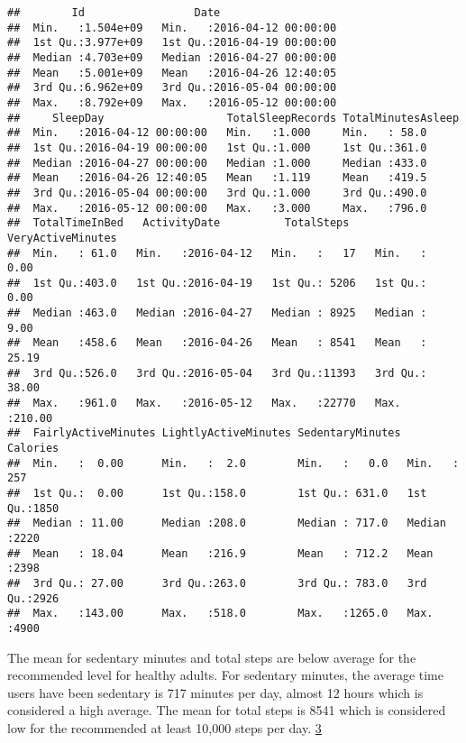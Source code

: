 \documentclass[
]{article}
\begin{document}
\begin{verbatim}
##        Id                 Date                    
##  Min.   :1.504e+09   Min.   :2016-04-12 00:00:00  
##  1st Qu.:3.977e+09   1st Qu.:2016-04-19 00:00:00  
##  Median :4.703e+09   Median :2016-04-27 00:00:00  
##  Mean   :5.001e+09   Mean   :2016-04-26 12:40:05  
##  3rd Qu.:6.962e+09   3rd Qu.:2016-05-04 00:00:00  
##  Max.   :8.792e+09   Max.   :2016-05-12 00:00:00  
##     SleepDay                   TotalSleepRecords TotalMinutesAsleep
##  Min.   :2016-04-12 00:00:00   Min.   :1.000     Min.   : 58.0     
##  1st Qu.:2016-04-19 00:00:00   1st Qu.:1.000     1st Qu.:361.0     
##  Median :2016-04-27 00:00:00   Median :1.000     Median :433.0     
##  Mean   :2016-04-26 12:40:05   Mean   :1.119     Mean   :419.5     
##  3rd Qu.:2016-05-04 00:00:00   3rd Qu.:1.000     3rd Qu.:490.0     
##  Max.   :2016-05-12 00:00:00   Max.   :3.000     Max.   :796.0     
##  TotalTimeInBed   ActivityDate          TotalSteps    VeryActiveMinutes
##  Min.   : 61.0   Min.   :2016-04-12   Min.   :   17   Min.   :  0.00   
##  1st Qu.:403.0   1st Qu.:2016-04-19   1st Qu.: 5206   1st Qu.:  0.00   
##  Median :463.0   Median :2016-04-27   Median : 8925   Median :  9.00   
##  Mean   :458.6   Mean   :2016-04-26   Mean   : 8541   Mean   : 25.19   
##  3rd Qu.:526.0   3rd Qu.:2016-05-04   3rd Qu.:11393   3rd Qu.: 38.00   
##  Max.   :961.0   Max.   :2016-05-12   Max.   :22770   Max.   :210.00   
##  FairlyActiveMinutes LightlyActiveMinutes SedentaryMinutes    Calories   
##  Min.   :  0.00      Min.   :  2.0        Min.   :   0.0   Min.   : 257  
##  1st Qu.:  0.00      1st Qu.:158.0        1st Qu.: 631.0   1st Qu.:1850  
##  Median : 11.00      Median :208.0        Median : 717.0   Median :2220  
##  Mean   : 18.04      Mean   :216.9        Mean   : 712.2   Mean   :2398  
##  3rd Qu.: 27.00      3rd Qu.:263.0        3rd Qu.: 783.0   3rd Qu.:2926  
##  Max.   :143.00      Max.   :518.0        Max.   :1265.0   Max.   :4900
\end{verbatim}

The mean for sedentary minutes and total steps are below average for the
recommended level for healthy adults. For sedentary minutes, the average
time users have been sedentary is 717 minutes per day, almost 12 hours
which is considered a high average. The mean for total steps is 8541
which is considered low for the recommended at least 10,000 steps per
day.
\href{https://ijbnpa.biomedcentral.com/articles/10.1186/1479-5868-8-79\#:~:text=In\%20summary\%2C\%20at\%20least\%20in,populace\%20\%5B3\%2C\%2023\%5D.}{3}
\end{document}
